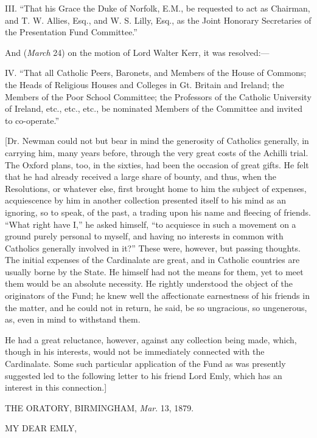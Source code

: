 III. ``That his Grace the Duke of Norfolk, E.M., be requested
to act as Chairman, and T. W. Allies, Esq., and W. S. Lilly, Esq., as
the Joint Honorary Secretaries of the Presentation Fund
Committee.''

And (\emph{March} 24) on the motion of Lord Walter Kerr, it was
resolved:—

IV. ``That all Catholic Peers, Baronets, and Members of the
House of Commons; the Heads of Religious Houses and Colleges in Gt.
Britain and Ireland; the Members of the Poor School Committee; the
Professors of the Catholic University of Ireland, etc., etc., etc., be
nominated Members of the Committee and invited to co-operate.''

[Dr. Newman could not but bear in mind the generosity of Catholics
generally, in carrying him, many years before, through the very great
costs of the Achilli trial. The Oxford plans, too, in the sixties, had
been the occasion of great gifts. He felt that he had already received
a large share of bounty, and thus, when the Resolutions, or whatever
else, first brought home to him the subject of expenses, acquiescence
by him in another collection presented itself to his mind as an
ignoring, so to speak, of the past, a trading upon his name and
fleecing of friends. ``What right have I,'' he asked himself,
``to acquiesce in such a movement on a ground purely personal to
myself, and having no interests in common with Catholics generally
involved in it?'' These were, however,
but passing thoughts. The initial expenses of the Cardinalate are
great, and in Catholic countries are usually borne by the State. He
himself had not the means for them, yet to meet them would be an
absolute necessity. He rightly understood the object of the
originators of the Fund; he knew well the affectionate earnestness of
his friends in the matter, and he could not in return, he said, be so
ungracious, so ungenerous, as, even in mind to withstand them.

He had a great reluctance, however, against any collection being
made, which, though in his interests, would not be immediately
connected with the Cardinalate. Some such particular application of
the Fund as was presently suggested led to the following letter to his
friend Lord Emly, which has an interest in this connection.]


THE ORATORY, BIRMINGHAM,
\emph{Mar}. 13, 1879.

MY DEAR EMLY,

